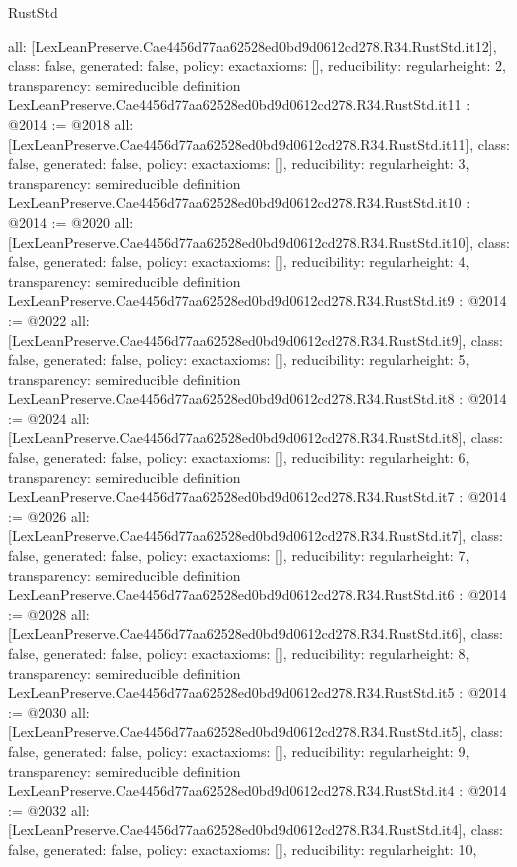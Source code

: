 \begin{lexlean}{RustStd}
\begin{coremodule}
{  all: [LexLeanPreserve.Cae4456d77aa62528ed0bd9d0612cd278.R34.RustStd.it12],
  class: false,
  generated: false,
  policy: exact{axioms: []},
  reducibility: regular{height: 2},
  transparency: semireducible
}
definition LexLeanPreserve.Cae4456d77aa62528ed0bd9d0612cd278.R34.RustStd.it11 : @2014 := @2018 {
  all: [LexLeanPreserve.Cae4456d77aa62528ed0bd9d0612cd278.R34.RustStd.it11],
  class: false,
  generated: false,
  policy: exact{axioms: []},
  reducibility: regular{height: 3},
  transparency: semireducible
}
definition LexLeanPreserve.Cae4456d77aa62528ed0bd9d0612cd278.R34.RustStd.it10 : @2014 := @2020 {
  all: [LexLeanPreserve.Cae4456d77aa62528ed0bd9d0612cd278.R34.RustStd.it10],
  class: false,
  generated: false,
  policy: exact{axioms: []},
  reducibility: regular{height: 4},
  transparency: semireducible
}
definition LexLeanPreserve.Cae4456d77aa62528ed0bd9d0612cd278.R34.RustStd.it9 : @2014 := @2022 {
  all: [LexLeanPreserve.Cae4456d77aa62528ed0bd9d0612cd278.R34.RustStd.it9],
  class: false,
  generated: false,
  policy: exact{axioms: []},
  reducibility: regular{height: 5},
  transparency: semireducible
}
definition LexLeanPreserve.Cae4456d77aa62528ed0bd9d0612cd278.R34.RustStd.it8 : @2014 := @2024 {
  all: [LexLeanPreserve.Cae4456d77aa62528ed0bd9d0612cd278.R34.RustStd.it8],
  class: false,
  generated: false,
  policy: exact{axioms: []},
  reducibility: regular{height: 6},
  transparency: semireducible
}
definition LexLeanPreserve.Cae4456d77aa62528ed0bd9d0612cd278.R34.RustStd.it7 : @2014 := @2026 {
  all: [LexLeanPreserve.Cae4456d77aa62528ed0bd9d0612cd278.R34.RustStd.it7],
  class: false,
  generated: false,
  policy: exact{axioms: []},
  reducibility: regular{height: 7},
  transparency: semireducible
}
definition LexLeanPreserve.Cae4456d77aa62528ed0bd9d0612cd278.R34.RustStd.it6 : @2014 := @2028 {
  all: [LexLeanPreserve.Cae4456d77aa62528ed0bd9d0612cd278.R34.RustStd.it6],
  class: false,
  generated: false,
  policy: exact{axioms: []},
  reducibility: regular{height: 8},
  transparency: semireducible
}
definition LexLeanPreserve.Cae4456d77aa62528ed0bd9d0612cd278.R34.RustStd.it5 : @2014 := @2030 {
  all: [LexLeanPreserve.Cae4456d77aa62528ed0bd9d0612cd278.R34.RustStd.it5],
  class: false,
  generated: false,
  policy: exact{axioms: []},
  reducibility: regular{height: 9},
  transparency: semireducible
}
definition LexLeanPreserve.Cae4456d77aa62528ed0bd9d0612cd278.R34.RustStd.it4 : @2014 := @2032 {
  all: [LexLeanPreserve.Cae4456d77aa62528ed0bd9d0612cd278.R34.RustStd.it4],
  class: false,
  generated: false,
  policy: exact{axioms: []},
  reducibility: regular{height: 10},
}
\end{coremodule}
\end{lexlean}

